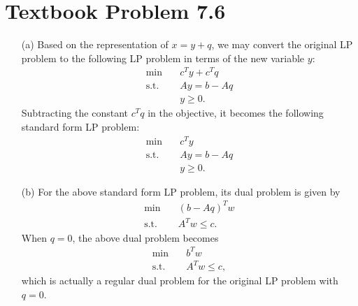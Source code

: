 \documentclass[11pt]{article}
\begin{document}
\section*{Textbook Problem 7.6}
\begin{itemize}
\item[(a)]Based on the representation of $x=y+q$, we may convert the original LP problem to the following LP problem in terms of the new variable $y$:
\begin{align*}
\min & \quad c^Ty+c^Tq\\
\text{s.t.} & \quad Ay=b-Aq\\
& \quad y\geq 0.
\end{align*}
Subtracting the constant $c^Tq$ in the objective, it becomes the following standard form LP problem:
\begin{align*}
\min & \quad c^Ty\\
\text{s.t.} & \quad Ay=b-Aq\\
& \quad y\geq 0.
\end{align*}
\item[(b)] For the above standard form LP problem, its dual problem is given by
\begin{align*}
\min & \quad (b-Aq)^Tw\\
\text{s.t.} & \quad A^Tw\leq c.
\end{align*}
When $q=0$, the above dual problem becomes
\begin{align*}
\min & \quad b^Tw\\
\text{s.t.} & \quad A^Tw\leq c,
\end{align*}
which is actually a regular dual problem for the original LP problem with $q=0$.
\end{itemize}
\end{document}
